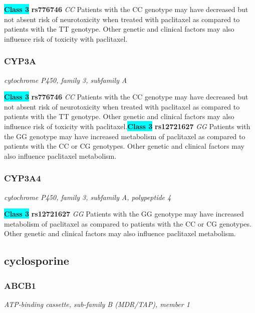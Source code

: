 \documentclass{report}
\begin{document}
\textbf{\colorbox{cyan} {Class 3}} \textbf{ rs776746 } \textit{ CC }
Patients with the CC genotype may have decreased but not absent risk of neurotoxicity when treated with paclitaxel as compared to patients with the TT genotype. Other genetic and clinical factors may also influence risk of toxicity with paclitaxel.\newline\subsubsection{ CYP3A }
\textit{ cytochrome P450, family 3, subfamily A }

\textbf{\colorbox{cyan} {Class 3}} \textbf{ rs776746 } \textit{ CC }
Patients with the CC genotype may have decreased but not absent risk of neurotoxicity when treated with paclitaxel as compared to patients with the TT genotype. Other genetic and clinical factors may also influence risk of toxicity with paclitaxel.\newline\textbf{\colorbox{cyan} {Class 3}} \textbf{ rs12721627 } \textit{ GG }
Patients with the GG genotype may have increased metabolism of paclitaxel as compared to patients with the CC or CG genotypes. Other genetic and clinical factors may also influence paclitaxel metabolism.\newline\subsubsection{ CYP3A4 }
\textit{ cytochrome P450, family 3, subfamily A, polypeptide 4 }

\textbf{\colorbox{cyan} {Class 3}} \textbf{ rs12721627 } \textit{ GG }
Patients with the GG genotype may have increased metabolism of paclitaxel as compared to patients with the CC or CG genotypes. Other genetic and clinical factors may also influence paclitaxel metabolism.\newline\subsection{ cyclosporine }\subsubsection{ ABCB1 }
\textit{ ATP-binding cassette, sub-family B (MDR/TAP), member 1 }
\end{document}
